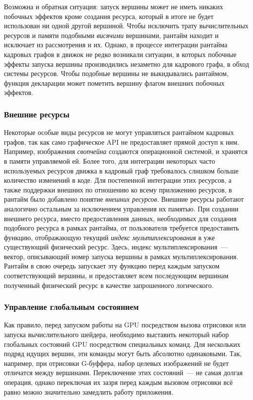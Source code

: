 Возможна и обратная ситуация: запуск вершины может не иметь никаких побочных эффектов кроме создания ресурса, который в итоге не будет использован ни одной другой вершиной.
Чтобы исключить трату вычислительных ресурсов и памяти подобными \textit{висячими} вершинами, рантайм находит и исключает из рассмотрения и их.
Однако, в процессе интеграции рантайма кадровых графов в движок не редко возникали ситуации, в которых побочные эффекты запуска вершины производились незаметно для кадрового графа, в обход системы ресурсов.
Чтобы подобные вершины не выкидывались рантаймом, функция декларации может пометить вершину флагом внешних побочных эффектов.

\subsubsection{Внешние ресурсы}
Некоторые особые виды ресурсов не могут управляться рантаймом кадровых графов, так как само графическое API не предоставляет прямой доступ к ним.
Например, изображения \textit{свопчейна} создаются операционной системой, и хранятся в памяти управляемой ей.
Более того, для интеграции некоторых часто используемых ресурсов движка в кадровый граф требовалось слишком больше количество изменений в коде.
Для постепенной интеграции этих ресурсов, а также поддержки внешних по отношению ко всему приложению ресурсов, в рантайм было добавлено понятие \textit{внешних ресурсов}.
Внешние ресурсы работают аналогично остальным за исключением управления их памятью.
При создании внешнего ресурса, вместо предоставления данных, необходимых для создания подобного ресурса в рамках рантайма, от пользователя требуется предоставить функцию, отображающую текущий \textit{индекс мультиплексирования} в уже существующий физический ресурс.
Здесь, индекс мультиплексирования~--- вектор, описывающий номер запуска вершины в рамках мультиплексирования.
Рантайм в свою очередь запускает эту функцию перед каждым запуском соответствующий вершины, и предоставляет всем последующим вершинам полученный физический ресурс в качестве запрошенного логического.

\subsubsection{Управление глобальным состоянием}
Как правило, перед запуском работы на GPU посредством вызова отрисовки или запуска вычислительного шейдера, необходимо выставить некоторый набор глобальных состояний GPU посредством специальных команд.
Для нескольких подряд идущих вершин, эти команды могут быть абсолютно одинаковыми.
Так, например, при отрисовки G-буффера, набор целевых изображений не будет отличатся между вершинами.
Переключение этих состояний~--- не самая долгая операция, однако переключая их зазря перед каждым вызовом отрисовки всё равно можно значительно замедлить работу приложения.

